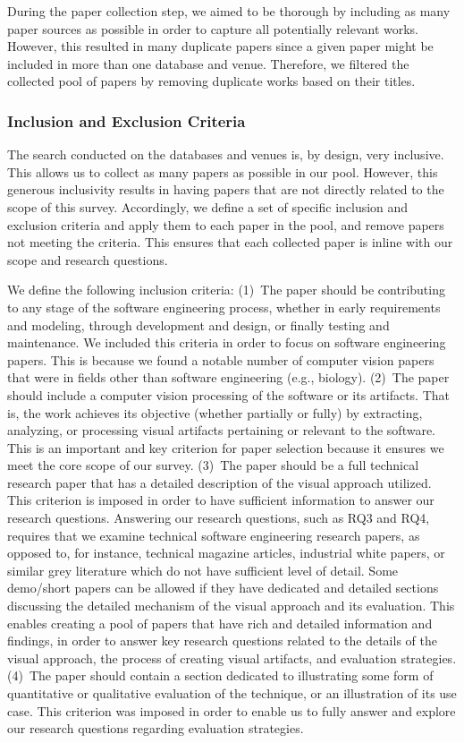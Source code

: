 During the paper collection step, we aimed to be
thorough by including as many paper sources as possible
in order to capture all potentially relevant works.
However, this resulted in many duplicate papers since a given
paper might be included in more than one database and venue.
Therefore, we filtered the collected pool
of papers by removing duplicate works based on their titles.

\subsubsection{Inclusion and Exclusion Criteria}\label{sec:inclusions} 
The search conducted on the databases and venues is, 
by design, very inclusive. This allows us to collect as many
papers as possible in our pool. 
However, this generous inclusivity results in having papers that are not directly
related to the scope of this survey.
Accordingly, we define a set of specific inclusion and exclusion criteria
and apply them to each paper in the pool, and remove papers not meeting the criteria.
This ensures that each collected paper is inline with our scope and research questions.

We define the following inclusion criteria: 
%
(1)~The paper should be contributing to any stage
of the software engineering process,
whether in early requirements and modeling,
through development and design, or finally testing and maintenance.
We included this criteria in order to focus on software engineering papers.
This is because we found a notable number of computer vision papers 
that were in fields other than software engineering (e.g., biology).
%
(2)~The paper should include a computer vision processing of the software or its artifacts.
That is, the work achieves its objective (whether partially or fully) by extracting,
analyzing, or processing visual artifacts pertaining or relevant to the software.
This is an important and key criterion for paper selection because it ensures
we meet the core scope of our survey. 
%
(3)~The paper should be a full technical research paper that has a
detailed description of the visual approach utilized.
This criterion is imposed in order to have sufficient information to answer our research questions.
Answering our research questions, such as RQ3 and RQ4, requires that 
we examine technical software engineering research papers,
as opposed to, for instance,
technical magazine articles, industrial white papers, or similar grey literature
which do not have sufficient level of detail.
Some demo/short papers can be allowed if they have dedicated and detailed 
sections discussing the detailed mechanism of the visual approach and its
evaluation. 
This enables creating a pool of papers that have
rich and detailed information and findings,
in order to answer key research questions related to
the details of the visual approach, the process of creating visual artifacts,
and evaluation strategies. 
%
(4)~The paper should contain a section dedicated to illustrating
some form of quantitative or qualitative evaluation of the technique,
or an illustration of its use case. 
This criterion was imposed in order to enable us to
fully answer and explore our research questions regarding evaluation strategies.


